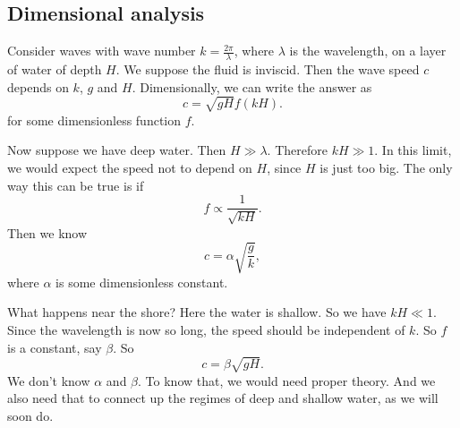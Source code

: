 \documentclass[a4paper]{article}
\begin{document}
\subsection{Dimensional analysis}
Consider waves with wave number $k = \frac{2\pi}{\lambda}$, where $\lambda$ is the wavelength, on a layer of water of depth $H$. We suppose the fluid is inviscid. Then the wave speed $c$ depends on $k$, $g$ and $H$. Dimensionally, we can write the answer as
\[
  c = \sqrt{gH} f(kH).
\]
for some dimensionless function $f$.

Now suppose we have deep water. Then $H \gg \lambda$. Therefore $kH \gg 1$. In this limit, we would expect the speed not to depend on $H$, since $H$ is just too big. The only way this can be true is if
\[
  f \propto \frac{1}{\sqrt{kH}}.
\]
Then we know
\[
  c = \alpha \sqrt{\frac{g}{k}},
\]
where $\alpha$ is some dimensionless constant.

What happens near the shore? Here the water is shallow. So we have $kH \ll 1$. Since the wavelength is now so long, the speed should be independent of $k$. So $f$ is a constant, say $\beta$. So
\[
  c = \beta\sqrt{gH}.
\]
We don't know $\alpha$ and $\beta$. To know that, we would need proper theory. And we also need that to connect up the regimes of deep and shallow water, as we will soon do.
\end{document}
